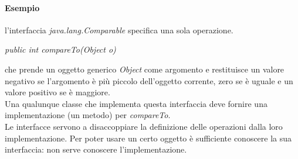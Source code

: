 \documentclass{article}
\begin{document}
	\paragraph*{Esempio} l'interfaccia \textit{java.lang.Comparable} specifica una sola operazione.
	\begin{center}
		\textit{public int compareTo(Object o)}
	\end{center}
	che prende un oggetto generico \textit{Object} come argomento e restituisce un valore negativo se l'argomento è più piccolo dell'oggetto corrente, zero se è uguale e un valore positivo se è maggiore. \\
	Una qualunque classe che implementa questa interfaccia deve fornire una implementazione (un metodo) per \textit{compareTo}.
	\vspace{\baselineskip} \\
	Le interfacce servono a disaccoppiare la definizione delle operazioni dalla loro implementazione. Per poter usare un certo oggetto è sufficiente conoscere la sua interfaccia: non serve conoscere l'implementazione.
\end{document}

